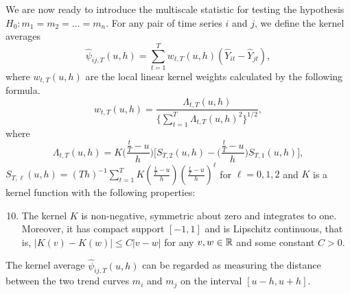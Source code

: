 \documentclass[a4paper,12pt]{article}
\begin{document}
We are now ready to introduce the multiscale statistic for testing the hypothesis $H_0: m_1 = m_2 = \ldots = m_n$. For any pair of time series $i$ and $j$, we define the kernel averages
\[ \widehat{\psi}_{ij,T}(u,h) = \sum\limits_{t=1}^T w_{t,T}(u,h)(\widehat{Y}_{it} - \widehat{Y}_{jt}), \]
where $w_{t,T}(u,h)$ are the local linear kernel weights calculated by the following formula.
\begin{equation}\label{weights}
w_{t,T}(u,h) = \frac{\Lambda_{t,T}(u,h)}{ \{\sum\nolimits_{t=1}^T \Lambda_{t,T}(u,h)^2 \}^{1/2} }, 
\end{equation}
where
\[ \Lambda_{t,T}(u,h) = K\Big(\frac{\frac{t}{T}-u}{h}\Big) \Big[ S_{T,2}(u,h) - \Big(\frac{\frac{t}{T}-u}{h}\Big) S_{T,1}(u,h) \Big], \]
$S_{T,\ell}(u,h) = (Th)^{-1} \sum\nolimits_{t=1}^T K(\frac{\frac{t}{T}-u}{h}) (\frac{\frac{t}{T}-u}{h})^\ell$ for $\ell = 0,1,2$ and $K$ is a kernel function with the following properties: 
\begin{enumerate}[label=(C\arabic*),leftmargin=1.05cm]
\setcounter{enumi}{9}
\item \label{C-ker} The kernel $K$ is non-negative, symmetric about zero and integrates to one. Moreover, it has compact support $[-1,1]$ and is Lipschitz continuous, that is, $|K(v) - K(w)| \le C |v-w|$ for any $v,w \in \mathbb{R}$ and some constant $C > 0$. 
\end{enumerate} 
The kernel average $\widehat{\psi}_{ij,T}(u,h)$ can be regarded as measuring the distance between the two trend curves $m_i$ and $m_j$ on the interval $[u-h,u+h]$.
\end{document}
